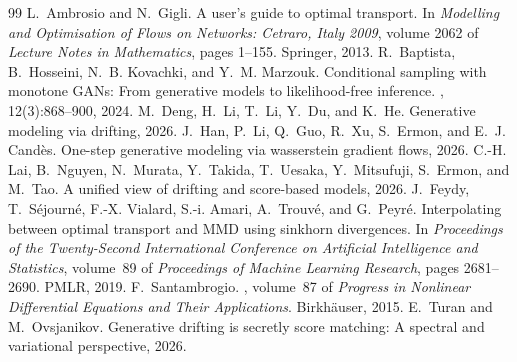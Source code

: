 \documentclass[10pt,a4paper]{amsart}
\begin{document}
\begin{thebibliography}{99}
 L.~Ambrosio and N.~Gigli. \newblock A user's guide to optimal transport. \newblock In {\em Modelling and Optimisation of Flows on Networks: Cetraro, Italy 2009}, volume 2062 of {\em Lecture Notes in Mathematics}, pages 1--155. Springer, 2013.
 R.~Baptista, B.~Hosseini, N.~B. Kovachki, and Y.~M. Marzouk. \newblock Conditional sampling with monotone {GAN}s: From generative models to likelihood-free inference. , 12(3):868--900, 2024.
 M.~Deng, H.~Li, T.~Li, Y.~Du, and K.~He. \newblock Generative modeling via drifting, 2026.
 J.~Han, P.~Li, Q.~Guo, R.~Xu, S.~Ermon, and E.~J. Cand{\`e}s. \newblock One-step generative modeling via wasserstein gradient flows, 2026.
 C.-H. Lai, B.~Nguyen, N.~Murata, Y.~Takida, T.~Uesaka, Y.~Mitsufuji, S.~Ermon, and M.~Tao. \newblock A unified view of drifting and score-based models, 2026.
 J.~Feydy, T.~S{\'e}journ{\'e}, F.-X. Vialard, S.-i. Amari, A.~Trouv{\'e}, and G.~Peyr{\'e}. \newblock Interpolating between optimal transport and {MMD} using sinkhorn divergences. \newblock In {\em Proceedings of the Twenty-Second International Conference on Artificial Intelligence and Statistics}, volume~89 of {\em Proceedings of Machine Learning Research}, pages 2681--2690. PMLR, 2019.
 F.~Santambrogio. , volume~87 of {\em Progress in Nonlinear Differential Equations and Their Applications}. \newblock Birkh{\"a}user, 2015.
 E.~Turan and M.~Ovsjanikov. \newblock Generative drifting is secretly score matching: A spectral and variational perspective, 2026.
\end{thebibliography}
\end{document}
